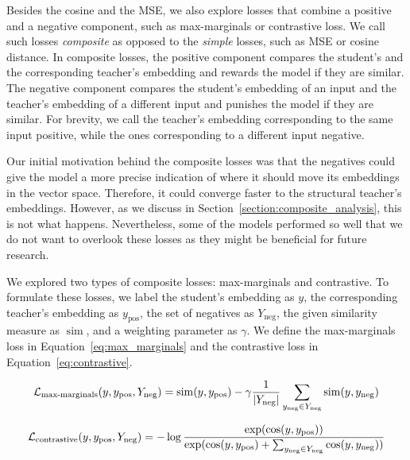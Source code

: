 Besides the cosine and the MSE, we also explore losses that combine a positive
and a negative component, such as max-marginals or contrastive loss. We call
such losses \emph{composite} as opposed to the \emph{simple} losses, such as
MSE or cosine distance. In composite losses, the positive component compares
the student's and the corresponding teacher's embedding and rewards the model
if they are similar. The negative component compares the student's embedding of
an input and the teacher's embedding of a different input and punishes the
model if they are similar. For brevity, we call the teacher's embedding corresponding to the same input positive, while the ones corresponding to
a different input negative.

Our initial motivation behind the composite losses was that the negatives could
give the model a more precise indication of where it should move its embeddings in
the vector space. Therefore, it could converge faster to the structural
teacher's embeddings. However, as we discuss in
Section~\ref{section:composite_analysis}, this is not what happens.
Nevertheless, some of the models performed so well that we do not want to overlook
these losses as they might be beneficial for future research.

We explored two types of composite losses: max-marginals and contrastive. To
formulate these losses, we label the student's embedding as $y$, the
corresponding teacher's embedding as $y_{\text{pos}}$, the set of negatives as
$Y_{\text{neg}}$, the given similarity measure as $\operatorname{sim}$, and a
weighting parameter as $\gamma$. We define the max-marginals loss in
Equation~\ref{eq:max_marginals} and the contrastive loss in
Equation~\ref{eq:contrastive}.


\begin{equation}
  \mathcal{L}_{\text{max-marginals}}(y, y_\text{pos}, Y_\text{neg}) =
    \operatorname{sim}(y, y_\text{pos}) -
    \gamma \frac{1}{|Y_\text{neg}|} \sum_{y_\text{neg} \in Y_\text{neg}}
      \operatorname{sim}(y, y_\text{neg})
  \label{eq:max_marginals}
\end{equation}

\begin{equation}
  \mathcal{L}_{\text{contrastive}}(y, y_\text{pos}, Y_\text{neg}) =
    -\log \frac{
      \exp(\cos(y, y_\text{pos}))
    }{
      \exp(
        \cos(y, y_\text{pos}) +
        \sum_{y_\text{neg} \in Y_\text{neg}} \cos(y, y_\text{neg})
      )
    }
  \label{eq:contrastive}
\end{equation}


